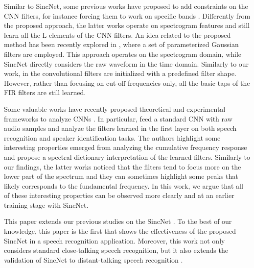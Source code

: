 \documentclass{article}
\begin{document}
Similar to SincNet, some previous works have proposed to add constraints on the CNN filters, for instance forcing them to work on specific bands \cite{tara_asru2013,learn_fbank_const}.  Differently from the proposed approach, the latter works operate on spectrogram features and still learn all the L elements of the CNN filters. An idea related to the proposed method has been recently explored in \cite{fbank_par}, where a set of parameterized Gaussian filters are employed. This approach operates on the spectrogram domain, while SincNet directly considers the raw waveform in the time domain. Similarly to our work, in \cite{Neil_ICASSP2018} the convolutional filters are initialized with a predefined filter shape.  However, rather than focusing on cut-off frequencies only,  all the basic taps of the FIR filters are still learned.

Some valuable works have recently proposed theoretical and experimental frameworks to analyze CNNs \cite{CNN_theory,CNN_mallat}.  In particular, \cite{Palaz_CNN_an,raw_speaker_id,Magimai_CNN_an} feed a standard CNN with raw audio samples and analyze the filters learned in the first layer on both speech recognition and speaker identification tasks. The authors highlight some interesting properties emerged from analyzing the cumulative frequency response and propose a spectral dictionary interpretation of the learned filters. Similarly to our findings, the latter works noticed that the filters tend to focus more on the lower part of the spectrum and they can sometimes highlight some peaks that likely corresponds to the fundamental frequency. In this work, we argue that all of these interesting properties can be observed more clearly and at an earlier training stage with SincNet.

This paper extends our previous studies on the SincNet \cite{SincNet}. To the best of our knowledge,  this paper is the first that shows the effectiveness of the proposed SincNet in a speech recognition application. Moreover, this work not only considers standard close-talking speech recognition, but it also extends the validation of SincNet to distant-talking speech recognition \cite{ravanelli_thesis,ravanelli_icassp,ravanelli15}. 







 


 

 
\end{document}
